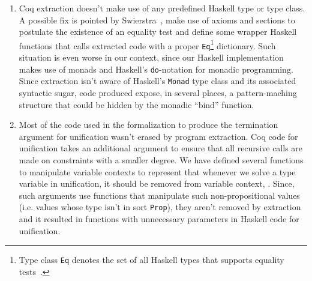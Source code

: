 \begin{enumerate}

  \item Coq extraction doesn't make use of any predefined Haskell type
    or type class. A possible fix is pointed by
    Swierstra~\cite{Swierstra12}, make use of axioms and sections to
    postulate the existence of an equality test and define some
    wrapper Haskell functions that calls extracted code with a proper
    \lstinline|Eq|\footnote{Type class \lstinline|Eq| denotes the set
      of all Haskell types that supports equality
      tests~\cite{Haskell98}.}  dictionary. Such situation is even
    worse in our context, since our Haskell implementation makes use
    of monads and Haskell's \lstinline|do|-notation for monadic
    programming.  Since extraction isn't aware of Haskell's
    \lstinline|Monad| type class and its associated syntactic sugar,
    code produced expose, in several places, a pattern-maching
    structure that could be hidden by the monadic ``bind'' function.

  \item Most of the code used in the formalization to produce the
    termination argument for unification wasn't erased by program
    extraction. Coq code for unification takes an additional argument
    to ensure that all recursive calls are made on constraints with a
    smaller degree. We have defined several functions to manipulate
    variable contexts to represent that whenever we solve a type
    variable in unification, it should be removed from variable
    context, \V. Since, such arguments use functions that manipulate
    such non-propositional values (i.e. values whose type isn't in
    sort \lstinline|Prop|), they aren't removed by extraction and it
    resulted in functions with unnecessary parameters in Haskell code
    for unification.
\end{enumerate}

